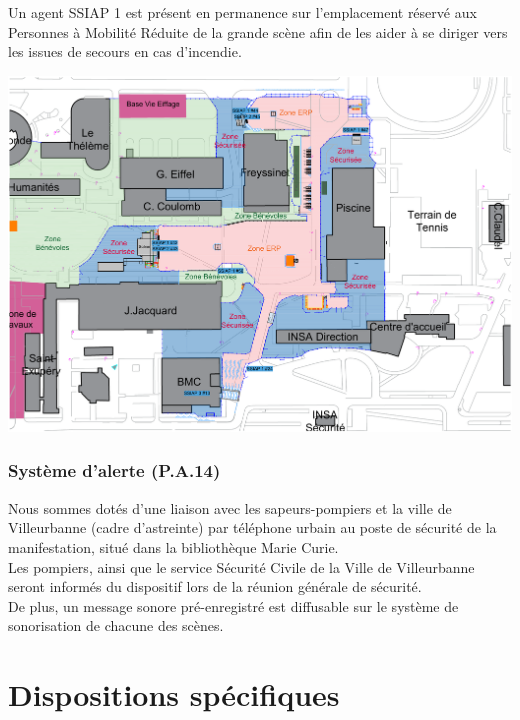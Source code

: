 \documentclass[hidelinks, paper=a4, fontsize=13pt]{report}
\begin{document}
Un agent SSIAP 1 est présent en permanence sur l’emplacement réservé aux Personnes à Mobilité Réduite de la grande scène afin de les aider à se diriger vers les issues de secours en cas d’incendie. 
\begin{center}
	\includegraphics[width=.8\textwidth,keepaspectratio]{Exports/Plan_24h_45eme-SSIAP}
\end{center}

\subsubsection{Système d'alerte  (P.A.14)}
\label{systemeAlerteIncendie}

Nous sommes dotés d’une liaison avec les sapeurs-pompiers et la ville de Villeurbanne (cadre d’astreinte) par téléphone urbain au poste de sécurité de la manifestation, situé dans la bibliothèque Marie Curie. \\

Les pompiers, ainsi que le service Sécurité Civile de la Ville de Villeurbanne seront informés du dispositif lors de la réunion générale de sécurité. \\

De plus, un message sonore pré-enregistré est diffusable sur le système de sonorisation de chacune des scènes.

\section{Dispositions spécifiques}
\end{document}

